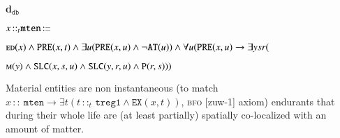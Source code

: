 \documentclass[ao]{iosart2x}
\newcommand{\bfoAxLabel}{\textrm{a$_\texttt{b}$}}
\newcommand{\dbDefLabel}{\textrm{d$_\texttt{db}$}}
\newcounter{cntdbdf}
\newcommand{\dbdf}[1]{\refstepcounter{cntdbdf}\begin{small}{\bf \dbDefLabel\thecntdbdf\label{#1}}\end{small}}
\newcommand{\refbfoax}[1]{({\bfoAxLabel}\ref{#1})}
\newcommand{\refdbdf}[1]{({\dbDefLabel}\ref{#1})}
\newcommand{\pr}[1]{\mathtt{#1}}
\newcommand{\cn}[1]{\mathtt{#1}}
\newcommand\textequal{%
 \rule[.08ex]{5pt}{0.35pt}\llap{\rule[.78ex]{5pt}{0.35pt}}}
\newcommand{\sdef}{{\hspace{1.5pt}:\hspace{-2.5pt}\textequal\hspace{3pt}}}
\newcommand{\bfo}{{\textsc{bfo}}}
\newcommand {\APOdcat} {\textsc{apo}}
\newcommand {\Mdcat} {\textsc{m}}
\newcommand {\ASdcat} {\textsc{as}}
\newcommand {\EDdcat} {\textsc{ed}}
\newcommand {\MOBdcat} {\textsc{mob}}
\newcommand {\NPOBdcat} {\textsc{npob}}
\newcommand {\PEDdcat} {\textsc{ped}}
\newcommand {\TPd} {\ensuremath{\pr{tP}}}
\newcommand {\Pd} {\ensuremath{\pr{P}}}
\newcommand {\ATd} {\ensuremath{\pr{AT}}}
\newcommand {\PREd} {\ensuremath{\pr{PRE}}}
\newcommand {\SDd} {\ensuremath{\pr{SD}}}
\newcommand {\Kd} {\ensuremath{\pr{K}}}
\newcommand {\EXDd} {\ensuremath{\pr{EXD}}}
\newcommand {\SLCd} {\ensuremath{\pr{SLC}}}
\newcommand{\idcntbcat}{\cn{idcnt}}
\newcommand{\sdcntbcat}{\cn{sdcnt}}
\newcommand{\mtenbcat}{\cn{mten}}
\newcommand{\tregbcat}{\cn{treg}}
\newcommand{\tintbcat}{\cn{tint}}
\newcommand{\onetregbcat}{\cn{treg1}}
\newcommand{\bfoexist}{\pr{EX}}
\newcommand{\bfoiof}[1]{{\,::_{#1\:\!}}}
\begin{document}
%

\item[\dbdf{d2b_mten}] $x \bfoiof{t} \mtenbcat \sdef \ $\parbox[t]{\textwidth}{$\EDdcat(x) \land 
\PREd(x,t) \land \exists u(\PREd(x,u) \land \neg \ATd(u)) \land \\
\forall u(\PREd(x,u) \to \exists ysr($\parbox[t]{\textwidth}{$\Mdcat(y) \land \SLCd(x,s,u) \land \SLCd(y,r,u) \land \Pd(r,s)))$}}

\vspace{1pt}
Material entities are non instantaneous (to match $x \bfoiof{} \mtenbcat \to \exists t(t \bfoiof{t} \onetregbcat \land \bfoexist(x,t))$, {\bfo} [zuw-1] axiom) endurants that during their whole life are (at least partially) spatially co-localized with an amount of matter.

%
%
%
%
%
%
%
\end{document}
